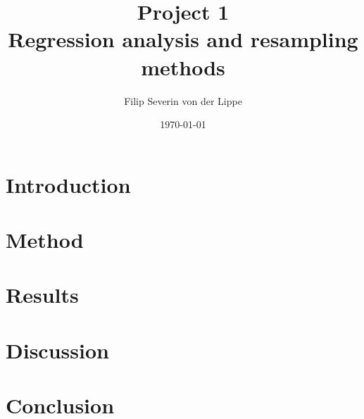 \documentclass[11pt]{article}
\title{Project 1\\ Regression analysis and resampling methods}
\author{Filip Severin von der Lippe}
\date{\today}
\begin{document}
\maketitle
\section{Introduction}
\section{Method}
\section{Results}
\section{Discussion}
\section{Conclusion}
\end{document}
